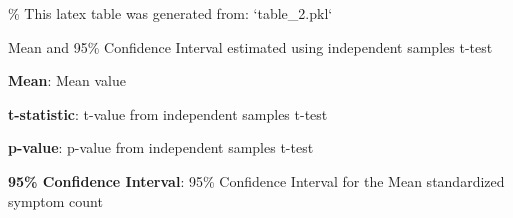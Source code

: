 \documentclass[11pt]{article}
\begin{document}
\begin{codeoutput}
\% This latex table was generated from: `table\_2.pkl`
\begin{table}[h]
\caption{Association between booster shot \& symptom count}
\label{table:table2}
\begin{threeparttable}
\renewcommand{\TPTminimum}{\linewidth}
\begin{tablenotes}
\footnotesize
\item Mean and 95\% Confidence Interval estimated using independent samples t-test
\item \textbf{Mean}: Mean value
\item \textbf{t-statistic}: t-value from independent samples t-test
\item \textbf{p-value}: p-value from independent samples t-test
\item \textbf{95\% Confidence Interval}: 95\% Confidence Interval for the Mean standardized symptom count
\end{tablenotes}
\end{threeparttable}
\end{table}
\end{codeoutput}
\end{document}
